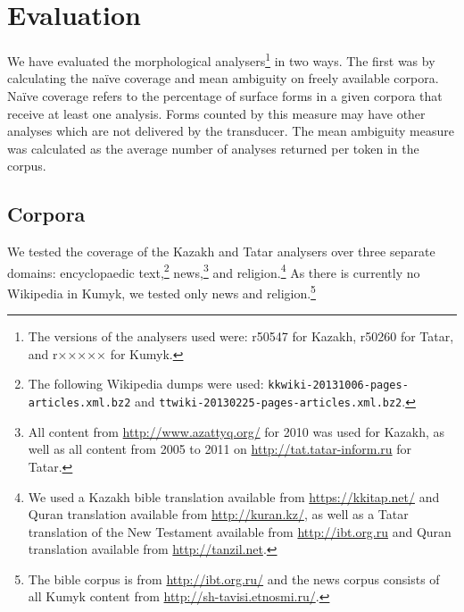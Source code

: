 \documentclass[a4paper,11pt,twocolumn]{article}
\begin{document}
\section{Evaluation}\label{sec:evaluation}

We have evaluated the morphological analysers\footnote{The versions of the analysers used were: r50547 for Kazakh, r50260 for Tatar, and r××××× for Kumyk.} in two ways. The first was by calculating the naïve coverage and mean ambiguity on freely available corpora. Naïve coverage refers to the percentage of surface forms in a given corpora that receive at least one analysis.  Forms counted by this measure may have other analyses which are not delivered by the transducer. The mean ambiguity measure was calculated as the average number of analyses returned per token in the corpus.


\subsection{Corpora}

We tested the coverage of the Kazakh and Tatar analysers over three separate domains: encyclopaedic text,\footnote{The following Wikipedia dumps were used: \texttt{kkwiki-20131006-pages-articles.xml.bz2} and \texttt{ttwiki-20130225-pages-articles.xml.bz2}.}
 news,\footnote{All content from \url{http://www.azattyq.org/} for 2010 was used for Kazakh, as well as all content from 2005 to 2011 on \url{http://tat.tatar-inform.ru} for Tatar.} and religion.\footnote{We used a Kazakh bible translation available from \url{https://kkitap.net/} and Quran translation available from \url{http://kuran.kz/}, as well as a Tatar translation of the New Testament available from \url{http://ibt.org.ru} and Quran translation available from \url{http://tanzil.net}.}  As there is currently no Wikipedia in Kumyk, we tested only news and religion.\footnote{The bible corpus is from \url{http://ibt.org.ru/} and the news corpus consists of all Kumyk content from \url{http://sh-tavisi.etnosmi.ru/}.}


\end{document}
